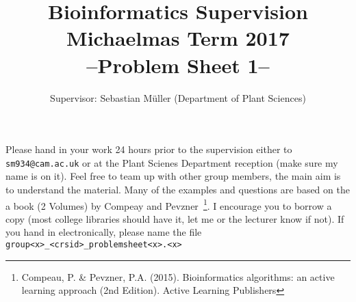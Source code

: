 \documentclass[11pt,runningheads,a4paper]{article}
\begin{document}

\title{{\LARGE Bioinformatics Supervision}\\
{\Large Michaelmas Term 2017}\\
{\Large --Problem Sheet 1--}} 

\author{Supervisor: Sebastian Müller (Department of Plant Sciences)}
\date{}

\maketitle

Please hand in your work 24 hours prior to the supervision either to \texttt{sm934@cam.ac.uk} or at the Plant Scienes Department reception (make sure my name is on it).
Feel free to team up with other group members, the main aim is to understand the material.
Many of the examples and questions are based on the a book (2 Volumes) by Compeay and Pevzner~\footnote{Compeau, P. \& Pevzner, P.A. (2015). Bioinformatics algorithms: an active learning approach (2nd Edition). Active Learning Publishers}. I encourage you to borrow a copy (most college libraries should have it, let me or the lecturer know if not).
If you hand in electronically, please name the file \texttt{group<x>\_<crsid>\_problemsheet<x>.<x>}
\end{document}
